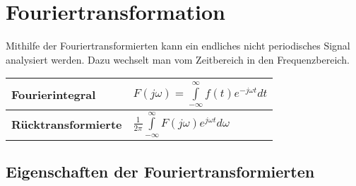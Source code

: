\section{Fouriertransformation}
Mithilfe der Fouriertransformierten kann ein endliches nicht periodisches Signal analysiert werden. Dazu wechselt man vom Zeitbereich in den Frequenzbereich.\\
\begin{tabular}{|l|l|}
	\hline \textbf{Fourierintegral} & $F(j\omega) = \int\limits_{-\infty}^{\infty} f(t)e^{-j\omega t}dt$\\
	\hline \textbf{Rücktransformierte} &$\frac{1}{2\pi}\int\limits_{-\infty}^{\infty}
	F(j\omega)e^{j\omega t}d\omega$\\
	\hline
\end{tabular}

\subsection{Eigenschaften der Fouriertransformierten}
